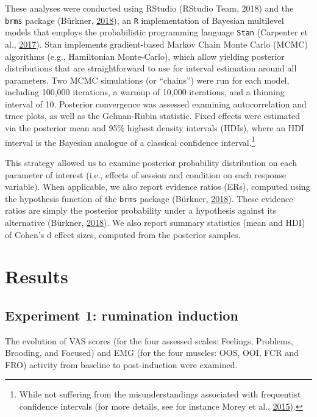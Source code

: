 \documentclass[a4paper,12pt,twoside,openright,oldfontcommands,final]{memoir}
\let\rmarkdownfootnote\footnote%
\def\footnote{\protect\rmarkdownfootnote}
\begin{document}
These analyses were conducted using RStudio (RStudio Team, 2018) and the \texttt{brms} package (Bürkner, \protect\hyperlink{ref-R-brms}{2018}), an \texttt{R} implementation of Bayesian multilevel models that employs the probabilistic programming language \texttt{Stan} (Carpenter et al., \protect\hyperlink{ref-carpenter_stan_2017}{2017}). Stan implements gradient-based Markov Chain Monte Carlo (MCMC) algorithms (e.g., Hamiltonian Monte-Carlo), which allow yielding posterior distributions that are straightforward to use for interval estimation around all parameters. Two MCMC simulations (or \enquote{chains}) were run for each model, including 100,000 iterations, a warmup of 10,000 iterations, and a thinning interval of 10. Posterior convergence was assessed examining autocorrelation and trace plots, as well as the Gelman-Rubin statistic. Fixed effects were estimated via the posterior mean and 95\% highest density intervals (HDIs), where an HDI interval is the Bayesian analogue of a classical confidence interval.\footnote{While not suffering from the misunderstandings associated with frequentist confidence intervals (for more details, see for instance Morey et al., \protect\hyperlink{ref-morey_fallacy_2015}{2015}).}

This strategy allowed us to examine posterior probability distribution on each parameter of interest (i.e., effects of session and condition on each response variable). When applicable, we also report evidence ratios (ERs), computed using the hypothesis function of the \texttt{brms} package (Bürkner, \protect\hyperlink{ref-R-brms}{2018}). These evidence ratios are simply the posterior probability under a hypothesis against its alternative (Bürkner, \protect\hyperlink{ref-R-brms}{2018}). We also report summary statistics (mean and HDI) of Cohen's d effect sizes, computed from the posterior samples.

\hypertarget{results}{%
\section{Results}\label{results}}

\hypertarget{experiment-1-rumination-induction-1}{%
\subsection{Experiment 1: rumination induction}\label{experiment-1-rumination-induction-1}}

The evolution of VAS scores (for the four assessed scales: Feelings, Problems, Brooding, and Focused) and EMG (for the four muscles: OOS, OOI, FCR and FRO) activity from baseline to post-induction were examined.
\end{document}
